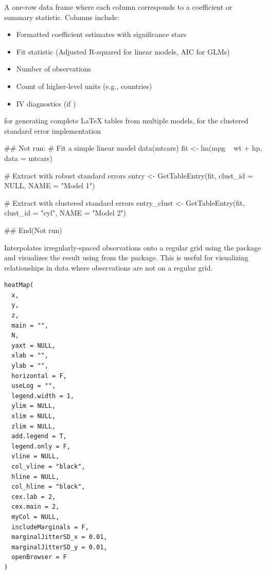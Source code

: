 \documentclass[a4paper]{book}
\begin{document}
%
\begin{Value}
A one-row data frame where each column corresponds to a coefficient
or summary statistic. Columns include:
\begin{itemize}

\item{} Formatted coefficient estimates with significance stars
\item{} Fit statistic (Adjusted R-squared for linear models, AIC for GLMs)
\item{} Number of observations
\item{} Count of higher-level units (e.g., countries)
\item{} IV diagnostics (if )

\end{itemize}

\end{Value}
%
\begin{SeeAlso}
 for generating complete LaTeX tables from
multiple models,  for the clustered standard error
implementation
\end{SeeAlso}
%
\begin{Examples}
\begin{ExampleCode}
## Not run: 
# Fit a simple linear model
data(mtcars)
fit <- lm(mpg ~ wt + hp, data = mtcars)

# Extract with robust standard errors
entry <- GetTableEntry(fit, clust_id = NULL, NAME = "Model 1")

# Extract with clustered standard errors
entry_clust <- GetTableEntry(fit, clust_id = "cyl", NAME = "Model 2")

## End(Not run)

\end{ExampleCode}
\end{Examples}
%
\begin{Description}
Interpolates irregularly-spaced  observations onto a regular
grid using the  package and visualizes the result using
 from the  package. This is useful
for visualizing relationships in data where observations are not on a regular
grid.
\end{Description}
%
\begin{Usage}
\begin{verbatim}
heatMap(
  x,
  y,
  z,
  main = "",
  N,
  yaxt = NULL,
  xlab = "",
  ylab = "",
  horizontal = F,
  useLog = "",
  legend.width = 1,
  ylim = NULL,
  xlim = NULL,
  zlim = NULL,
  add.legend = T,
  legend.only = F,
  vline = NULL,
  col_vline = "black",
  hline = NULL,
  col_hline = "black",
  cex.lab = 2,
  cex.main = 2,
  myCol = NULL,
  includeMarginals = F,
  marginalJitterSD_x = 0.01,
  marginalJitterSD_y = 0.01,
  openBrowser = F
)
\end{verbatim}
\end{Usage}
\end{document}
